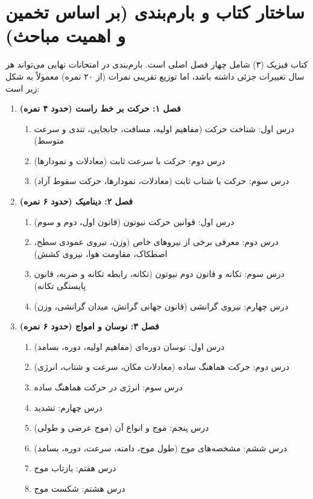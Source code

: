 \documentclass[12pt]{article}
\begin{document}
\section{ساختار کتاب و بارم‌بندی (بر اساس تخمین و اهمیت مباحث)}

کتاب فیزیک (۳) شامل چهار فصل اصلی است. بارم‌بندی در امتحانات نهایی می‌تواند هر سال تغییرات جزئی داشته باشد، اما توزیع تقریبی نمرات (از ۲۰ نمره) معمولاً به شکل زیر است:

\begin{enumerate}
    \item \textbf{فصل ۱: حرکت بر خط راست (حدود ۴ نمره)}
    \begin{enumerate}
        \item درس اول: شناخت حرکت (مفاهیم اولیه، مسافت، جابجایی، تندی و سرعت متوسط)
        \item درس دوم: حرکت با سرعت ثابت (معادلات و نمودارها)
        \item درس سوم: حرکت با شتاب ثابت (معادلات، نمودارها، حرکت سقوط آزاد)
    \end{enumerate}

    \item \textbf{فصل ۲: دینامیک (حدود ۶ نمره)}
    \begin{enumerate}
        \item درس اول: قوانین حرکت نیوتون (قانون اول، دوم و سوم)
        \item درس دوم: معرفی برخی از نیروهای خاص (وزن، نیروی عمودی سطح، اصطکاک، مقاومت هوا، نیروی کشش)
        \item درس سوم: تکانه و قانون دوم نیوتون (تکانه، رابطه تکانه و ضربه، قانون پایستگی تکانه)
        \item درس چهارم: نیروی گرانشی (قانون جهانی گرانش، میدان گرانشی، وزن)
    \end{enumerate}

    \item \textbf{فصل ۳: نوسان و امواج (حدود ۶ نمره)}
    \begin{enumerate}
        \item درس اول: نوسان دوره‌ای (مفاهیم اولیه، دوره، بسامد)
        \item درس دوم: حرکت هماهنگ ساده (معادلات مکان، سرعت و شتاب، انرژی)
        \item درس سوم: انرژی در حرکت هماهنگ ساده
        \item درس چهارم: تشدید
        \item درس پنجم: موج و انواع آن (موج عرضی و طولی)
        \item درس ششم: مشخصه‌های موج (طول موج، دامنه، سرعت، دوره، بسامد)
        \item درس هفتم: بازتاب موج
        \item درس هشتم: شکست موج
    \end{enumerate}


\end{enumerate}
\end{document}
